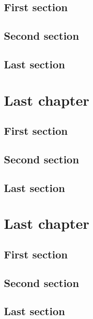 \documentclass{mines-thesis}
\begin{document}
\section{First section} \lipsum[2-3]
\section{Second section} \lipsum[4-5]
\section{Last section} \lipsum[6-7]
\chapter{Last chapter} \lipsum[1]
\section{First section} \lipsum[2-3]
\section{Second section} \lipsum[4-5]
\section{Last section} \lipsum[6-7]
\chapter{Last chapter} \lipsum[1]
\section{First section} \lipsum[2-3]
\section{Second section} \lipsum[4-5]
\section{Last section} \lipsum[6-7]
\end{document}
